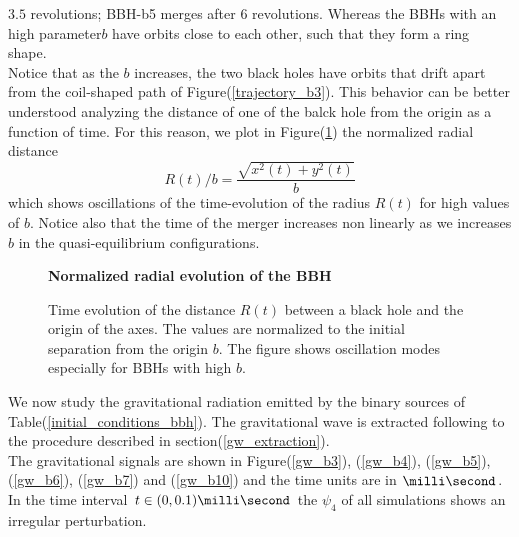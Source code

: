 $3.5$ revolutions; BBH-b5 merges after $6$ revolutions.
Whereas the BBHs with an high parameter$b$ have orbits close to each other, such that they form a ring shape.\\
Notice that as the $b$ increases, the two black holes have orbits that drift apart from the coil-shaped path of Figure(\ref{trajectory_b3}).
This behavior can be better understood analyzing the distance of one of the balck hole from the origin as a function of time. 
For this reason, we plot in Figure(\ref{radius_evolution}) the normalized radial distance
\[
R(t)/b = \frac{\sqrt{x ^{2} (t) + y^{2} (t)}}{b}
\]
which shows oscillations of the time-evolution of the radius $R(t)$ for high values of $b$.
Notice also that the time of the merger increases non linearly as we increases $b$ in the quasi-equilibrium configurations.
\begin{figure}
\centering
    \textbf{Normalized radial evolution of the BBH}\par\medskip
{}
\caption{Time evolution of the distance $R(t)$ between a black hole and the origin of the axes. The values are normalized to the initial separation from the origin $b$. The figure shows oscillation modes especially for BBHs with high $b$.}
\label{radius_evolution}
\end{figure}
\par
We now study the gravitational radiation emitted by the binary sources of Table(\ref{initial_conditions_bbh}). The gravitational wave is extracted following to the procedure described in section(\ref{gw_extraction}).\\
The gravitational signals are shown in Figure(\ref{gw_b3}), (\ref{gw_b4}), (\ref{gw_b5}), (\ref{gw_b6}), (\ref{gw_b7}) and (\ref{gw_b10}) and the time units are in $\milli \second$.
In the time interval $t \in (0,0.1)\milli \second$ the $\psi_4$ of all simulations shows an irregular perturbation. 
